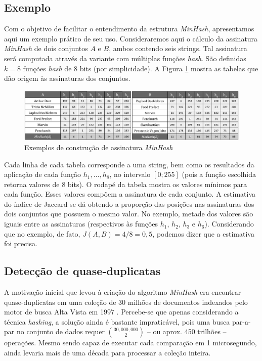 \subsection{Exemplo}\label{sec:minhash:example}

Com o objetivo de facilitar o entendimento da estrutura \emph{MinHash}, apresentamos aqui um exemplo prático de seu uso. Consideraremos aqui o cálculo da assinatura \emph{MinHash} de dois conjuntos $A$ e $B$, ambos contendo seis strings. Tal assinatura será computada através da variante com múltiplas funções \emph{hash}. São definidas $k=8$ funções \emph{hash} de 8 bits (por simplicidade). A Figura \ref{fig:minhash_example} mostra as tabelas que dão origem às assinaturas dos conjuntos.

\begin{figure}[!htbp]
  \centering
  \includegraphics[scale=0.6]{figures/minhash_example.pdf}
  \caption{Exemplos de construção de assinatura \emph{MinHash}}
  \label{fig:minhash_example}
\end{figure}

Cada linha de cada tabela corresponde a uma string, bem como os resultados da aplicação de cada função $h_1, \ldots, h_8$, no intervalo $[0; 255]$ (pois a função escolhida retorna valores de 8 bits). O rodapé da tabela mostra os valores mínimos para cada função. Esses valores compõem a assinatura de cada conjunto. A estimativa do índice de Jaccard se dá obtendo a proporção das posições nas assinaturas dos dois conjuntos que possuem o mesmo valor. No exemplo, metade dos valores são iguais entre as assinaturas (respectivos às funções $h_1$, $h_2$, $h_3$ e $h_6$). Considerando que no exemplo, de fato, $J(A, B) = 4/8 = 0,5$, podemos dizer que a estimativa foi precisa.

\subsection{Detecção de quase-duplicatas}\label{sec:min:duplicate}

A motivação inicial que levou à criação do algoritmo \emph{MinHash} era encontrar quase-duplicatas em uma coleção de 30 milhões de documentos indexados pelo motor de busca Alta Vista em 1997 \cite{broder1997resemblance}. Percebe-se que apenas considerando a técnica \emph{hashing}, a solução ainda é bastante impraticável, pois uma busca par-a-par no conjunto de dados requer $\binom{30,000,000}{2}$ -- ou aprox. 450 trilhões -- operações. Mesmo sendo capaz de executar cada comparação em 1 microsegundo, ainda levaria mais de uma década para processar a coleção inteira.


